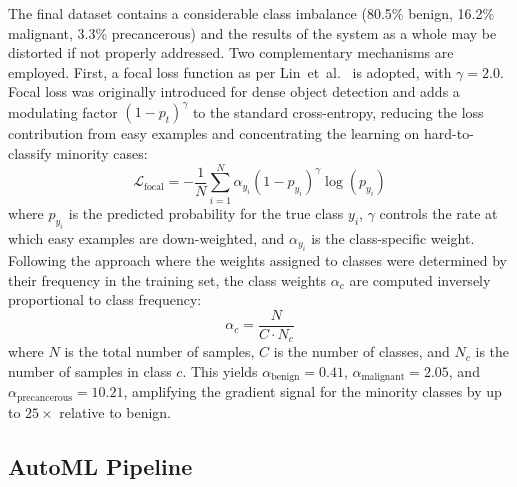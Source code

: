 \documentclass[conference]{IEEEtran}
\begin{document}
The final dataset contains a considerable class imbalance (80.5\% benign, 16.2\% malignant, 3.3\% precancerous) and the results of the system as a whole may be distorted if not properly addressed. Two complementary mechanisms are employed. First, a focal loss function as per Lin~et~al.~\cite{b25} is adopted, with $\gamma = 2.0$. Focal loss was originally introduced for dense object detection and adds a modulating factor $(1 - p_t)^\gamma$ to the standard cross-entropy, reducing the loss contribution from easy examples and concentrating the learning on hard-to-classify minority cases:
\begin{equation}
\mathcal{L}_{\text{focal}} = -\frac{1}{N}\sum_{i=1}^{N} \alpha_{y_i} (1 - p_{y_i})^\gamma \log(p_{y_i})
\label{eq:focal}
\end{equation}
where $p_{y_i}$ is the predicted probability for the true class $y_i$, $\gamma$ controls the rate at which easy examples are down-weighted, and $\alpha_{y_i}$ is the class-specific weight. Following the approach where the weights assigned to classes were determined by their frequency in the training set, the class weights $\alpha_c$ are computed inversely proportional to class frequency:
\begin{equation}
\alpha_c = \frac{N}{C \cdot N_c}
\label{eq:classweight}
\end{equation}
where $N$ is the total number of samples, $C$ is the number of classes, and $N_c$ is the number of samples in class $c$. This yields $\alpha_{\text{benign}} = 0.41$, $\alpha_{\text{malignant}} = 2.05$, and $\alpha_{\text{precancerous}} = 10.21$, amplifying the gradient signal for the minority classes by up to $25\times$ relative to benign.
 
\subsection{AutoML Pipeline}
 
\end{document}
